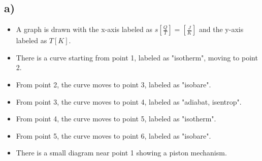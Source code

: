 

\subsection*{a)}

\begin{itemize}
    \item A graph is drawn with the x-axis labeled as $s \left[ \frac{Q}{T} \right] = \left[ \frac{J}{K} \right]$ and the y-axis labeled as $T \left[ K \right]$.
    \item There is a curve starting from point 1, labeled as "isotherm", moving to point 2.
    \item From point 2, the curve moves to point 3, labeled as "isobare".
    \item From point 3, the curve moves to point 4, labeled as "adiabat, isentrop".
    \item From point 4, the curve moves to point 5, labeled as "isotherm".
    \item From point 5, the curve moves to point 6, labeled as "isobare".
    \item There is a small diagram near point 1 showing a piston mechanism.
\end{itemize}